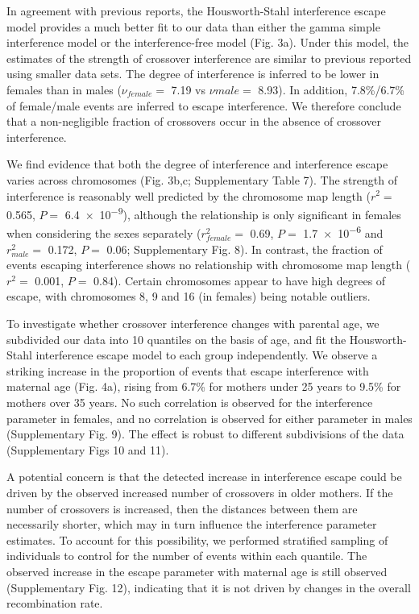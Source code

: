 In agreement with previous reports\cite{Housworth2003,Fledel-Alon2009}, the Housworth-Stahl
interference escape model provides a much better fit to our
data than either the gamma simple interference model or the
interference-free model (Fig. 3a). Under this model, the estimates
of the strength of crossover interference are similar to previous
reported using smaller data sets\cite{Fledel-Alon2009}. The degree of interference is
inferred to be lower in females than in males ($\nu_{female}=$ 7.19 vs
$\nu{male}=$ 8.93). In addition, 7.8\%/6.7\% of female/male events are
inferred to escape interference. We therefore conclude that a
non-negligible fraction of crossovers occur in the absence of
crossover interference.

We find evidence that both the degree of interference and
interference escape varies across chromosomes (Fig. 3b,c;
Supplementary Table 7). The strength of interference is reasonably 
well predicted by the chromosome map length ($r^2=$ 0.565,
$P=$ \num{6.4e-9}), although the relationship is only significant in
females when considering the sexes separately ($r^2_{female}=$ 0.69,
$P=$ \num{1.7e-6} and $r^2_{male}=$ 0.172, $P=$ 0.06; Supplementary Fig. 8).
In contrast, the fraction of events escaping interference shows no
relationship with chromosome map length ($r^2=$ 0.001, $P=$ 0.84).
Certain chromosomes appear to have high degrees of escape, with
chromosomes 8, 9 and 16 (in females) being notable outliers.

To investigate whether crossover interference changes with
parental age, we subdivided our data into 10 quantiles on the
basis of age, and fit the Housworth-Stahl interference escape
model to each group independently. We observe a striking
increase in the proportion of events that escape interference with
maternal age (Fig. 4a), rising from 6.7\% for mothers under 25
years to 9.5\% for mothers over 35 years. No such correlation is
observed for the interference parameter in females, and no
correlation is observed for either parameter in males
(Supplementary Fig. 9). The effect is robust to different subdivisions %
of the data (Supplementary Figs 10 and 11).

A potential concern is that the detected increase in interference
escape could be driven by the observed increased number of
crossovers in older mothers. If the number of crossovers is 
increased, then the distances between them are necessarily
shorter, which may in turn influence the interference parameter
estimates. To account for this possibility, we performed stratified
sampling of individuals to control for the number of events
within each quantile. The observed increase in the escape
parameter with maternal age is still observed (Supplementary
Fig. 12), indicating that it is not driven by changes in the overall
recombination rate.

